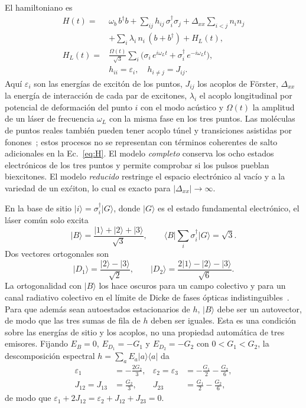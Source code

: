 \documentclass[aps,pra,twocolumn,groupedaddress,amsmath,amssymb,floatfix]{revtex4-2}
\newcommand{\ket}[1]{\lvert #1\rangle}
\newcommand{\bra}[1]{\langle #1\rvert}
\newcommand{\wb}{\omega_b}
\newcommand{\Dxx}{\Delta_{xx}}
\begin{document}
El hamiltoniano es
\begin{align}
H(t)={}&\wb\, b^\dagger b+\sum_{ij}h_{ij}\,\sigma_i^\dagger\sigma_j
+\Dxx\sum_{i<j}n_in_j\nonumber\\
&+\sum_i\lambda_i\,n_i\,(b+b^\dagger)+H_L(t),\label{eq:H}\\
H_L(t)={}&\frac{\Omega(t)}{\sqrt3}\sum_i\bigl(\sigma_i\,e^{i\omega_Lt}+\sigma_i^\dagger\,e^{-i\omega_Lt}\bigr),\nonumber\\
&h_{ii}=\varepsilon_i,\quad h_{i\neq j}=J_{ij}.\nonumber
\end{align}
Aqu\'i $\varepsilon_i$ son las energ\'ias de excit\'on de los puntos, $J_{ij}$ los acoplos de F\"orster, $\Dxx$ la energ\'ia de interacci\'on de cada par de excitones, $\lambda_i$ el acoplo longitudinal por potencial de deformaci\'on del punto $i$ con el modo ac\'ustico y $\Omega(t)$ la amplitud de un l\'aser de frecuencia $\omega_L$ con la misma fase en los tres puntos. Las mol\'eculas de puntos reales tambi\'en pueden tener acoplo t\'unel y transiciones asistidas por fonones~\cite{daniels2013}; estos procesos no se representan con t\'erminos coherentes de salto adicionales en la Ec.~\eqref{eq:H}. El modelo \emph{completo} conserva los ocho estados electr\'onicos de los tres puntos y permite comprobar si los pulsos pueblan biexcitones. El modelo \emph{reducido} restringe el espacio electr\'onico al vac\'io y a la variedad de un ex\'citon, lo cual es exacto para $|\Dxx|\to\infty$.

En la base de sitio $\ket{i}=\sigma_i^\dagger\ket{G}$, donde $\ket G$ es el estado fundamental electr\'onico, el l\'aser com\'un solo excita
\begin{equation}
\ket{B}=\frac{\ket1+\ket2+\ket3}{\sqrt3},\qquad
\bra{B}\sum_i\sigma_i^\dagger\ket G=\sqrt3 .\label{eq:bright}
\end{equation}
Dos vectores ortogonales son
\begin{equation}
\ket{D_1}=\frac{\ket2-\ket3}{\sqrt2},\qquad
\ket{D_2}=\frac{2\ket1-\ket2-\ket3}{\sqrt6}.\label{eq:dark}
\end{equation}
La ortogonalidad con $\ket B$ los hace oscuros para un campo colectivo y para un canal radiativo colectivo en el l\'imite de Dicke de fases \'opticas indistinguibles~\cite{dicke1954,mokhlespour2012}. Para que adem\'as sean autoestados estacionarios de $h$, $\ket B$ debe ser un autovector, de modo que las tres sumas de fila de $h$ deben ser iguales. Esta es una condici\'on sobre las energ\'ias de sitio y los acoplos, no una propiedad autom\'atica de tres emisores. Fijando $E_B=0$, $E_{D_1}=-G_1$ y $E_{D_2}=-G_2$ con $0<G_1<G_2$, la descomposici\'on espectral $h=\sum_aE_a\ket a\bra a$ da
\begin{align}
\varepsilon_1&=-\frac{2G_2}{3},&
\varepsilon_2=\varepsilon_3&=-\frac{G_1}{2}-\frac{G_2}{6},\nonumber\\
J_{12}=J_{13}&=\frac{G_2}{3},&
J_{23}&=\frac{G_1}{2}-\frac{G_2}{6},\label{eq:inverse}
\end{align}
de modo que $\varepsilon_1+2J_{12}=\varepsilon_2+J_{12}+J_{23}=0$.
\end{document}

